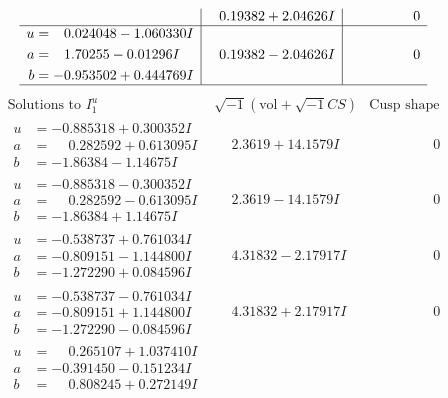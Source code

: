 \documentclass[1p]{elsarticle_modified}
\theoremstyle{definition}
\newcommand{\I}{\sqrt{-1}}
\begin{document}
$$\begin{array}{c|c|c}
 & \phantom{-}0.19382 + 2.04626 I & \phantom{-0.000000 } 0 \\ \hline\begin{aligned}
u &= \phantom{-}0.024048 - 1.060330 I \\
a &= \phantom{-}1.70255 - 0.01296 I \\
b &= -0.953502 + 0.444769 I\end{aligned}
 & \phantom{-}0.19382 - 2.04626 I & \phantom{-0.000000 } 0\\
 \hline 
 \end{array}$$\newpage$$\begin{array}{c|c|c}  
\text{Solutions to }I^u_{1}& \I (\text{vol} + \sqrt{-1}CS) & \text{Cusp shape}\\
 \hline 
\begin{aligned}
u &= -0.885318 + 0.300352 I \\
a &= \phantom{-}0.282592 + 0.613095 I \\
b &= -1.86384 - 1.14675 I\end{aligned}
 & \phantom{-}2.3619 + 14.1579 I & \phantom{-0.000000 } 0 \\ \hline\begin{aligned}
u &= -0.885318 - 0.300352 I \\
a &= \phantom{-}0.282592 - 0.613095 I \\
b &= -1.86384 + 1.14675 I\end{aligned}
 & \phantom{-}2.3619 - 14.1579 I & \phantom{-0.000000 } 0 \\ \hline\begin{aligned}
u &= -0.538737 + 0.761034 I \\
a &= -0.809151 - 1.144800 I \\
b &= -1.272290 + 0.084596 I\end{aligned}
 & \phantom{-}4.31832 - 2.17917 I & \phantom{-0.000000 } 0 \\ \hline\begin{aligned}
u &= -0.538737 - 0.761034 I \\
a &= -0.809151 + 1.144800 I \\
b &= -1.272290 - 0.084596 I\end{aligned}
 & \phantom{-}4.31832 + 2.17917 I & \phantom{-0.000000 } 0 \\ \hline\begin{aligned}
u &= \phantom{-}0.265107 + 1.037410 I \\
a &= -0.391450 - 0.151234 I \\
b &= \phantom{-}0.808245 + 0.272149 I\end{aligned}

\end{array}$$
\end{document}
